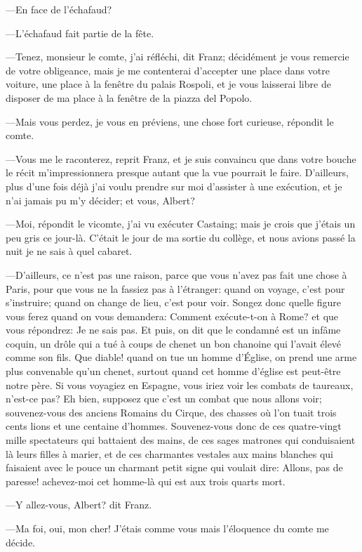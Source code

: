 —En face de l'échafaud? 

—L'échafaud fait partie de la fête. 

—Tenez, monsieur le comte, j'ai réfléchi, dit Franz; décidément je vous remercie de votre obligeance, mais je me contenterai d'accepter une place dans votre voiture, une place à la fenêtre du palais Rospoli, et je vous laisserai libre de disposer de ma place à la fenêtre de la piazza del Popolo. 

—Mais vous perdez, je vous en préviens, une chose fort curieuse, répondit le comte. 

—Vous me le raconterez, reprit Franz, et je suis convaincu que dans votre bouche le récit m'impressionnera presque autant que la vue pourrait le faire. D'ailleurs, plus d'une fois déjà j'ai voulu prendre sur moi d'assister à une exécution, et je n'ai jamais pu m'y décider; et vous, Albert? 

—Moi, répondit le vicomte, j'ai vu exécuter Castaing; mais je crois que j'étais un peu gris ce jour-là. C'était le jour de ma sortie du collège, et nous avions passé la nuit je ne sais à quel cabaret. 

—D'ailleurs, ce n'est pas une raison, parce que vous n'avez pas fait une chose à Paris, pour que vous ne la fassiez pas à l'étranger: quand on voyage, c'est pour s'instruire; quand on change de lieu, c'est pour voir. Songez donc quelle figure vous ferez quand on vous demandera: Comment exécute-t-on à Rome? et que vous répondrez: Je ne sais pas. Et puis, on dit que le condamné est un infâme coquin, un drôle qui a tué à coups de chenet un bon chanoine qui l'avait élevé comme son fils. Que diable! quand on tue un homme d'Église, on prend une arme plus convenable qu'un chenet, surtout quand cet homme d'église est peut-être notre père. Si vous voyagiez en Espagne, vous iriez voir les combats de taureaux, n'est-ce pas? Eh bien, supposez que c'est un combat que nous allons voir; souvenez-vous des anciens Romains du Cirque, des chasses où l'on tuait trois cents lions et une centaine d'hommes. Souvenez-vous donc de ces quatre-vingt mille spectateurs qui battaient des mains, de ces sages matrones qui conduisaient là leurs filles à marier, et de ces charmantes vestales aux mains blanches qui faisaient avec le pouce un charmant petit signe qui voulait dire: Allons, pas de paresse! achevez-moi cet homme-là qui est aux trois quarts mort. 

—Y allez-vous, Albert? dit Franz. 

—Ma foi, oui, mon cher! J'étais comme vous mais l'éloquence du comte me décide.  

